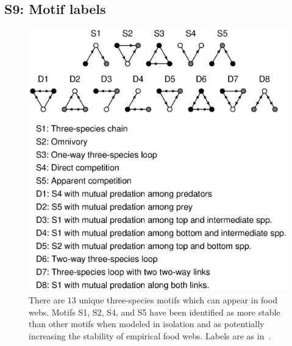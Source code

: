 \documentclass[12pt]{article}
\begin{document}
\begin{spacing}{2.0}
\section*{S9: Motif labels}

	\begin{figure}[h!]
		\caption{There are 13 unique three-species motifs which can appear in food webs. Motifs S1, S2, S4, and S5 have been identified as more stable than other motifs when modeled in isolation and as potentially increasing the stability of empirical food webs. Labels are as in~\citet{Stouffer2007}.}
		\label{motifs}
		\includegraphics[width=.8\textwidth]{figures/motifs.eps}
		\end{figure}

\end{spacing}
\clearpage

     
\end{document}
